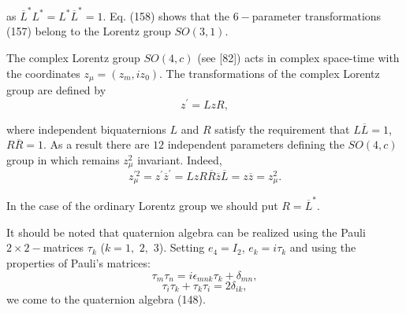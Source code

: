 \documentclass[a4paper,12pt]{article}
\begin{document}
as $\overline{L}^{*}L^{*}=L^{*}\overline{L}^{*}=1.$ Eq. (158)
shows that the $6-$parameter transformations (157) belong to the
Lorentz group $ SO(3,1) $.

The complex Lorentz group $SO(4,c)$ (see [82]) acts in complex
space-time with the coordinates $z_\mu =(z_m,iz_0)$. The
transformations of the complex Lorentz group are defined by
\begin{equation}
z^{\prime }=LzR,  \label{159}
\end{equation}

where independent biquaternions $L$ and $R$ satisfy the
requirement that $L \overline{L}=1$, $R\overline{R}=1$. As a
result there are $12$ independent parameters defining the
$SO(4,c)$ group in which remains $z_\mu ^2$ invariant. Indeed,
\begin{equation}
z_\mu ^{\prime 2}=z^{\prime }\overline{z}^{\prime
}=LzR\overline{R}\overline{ z}\overline{L}=z\overline{z}=z_\mu ^2.
\label{160}
\end{equation}

In the case of the ordinary Lorentz group we should put $R=\overline{L}^{*}$.

It should be noted that quaternion algebra can be realized using
the Pauli $ 2\times 2-$matrices $\tau _k$ ($k=1,$ $2,$ $3$).
Setting $e_4=I_2$, $ e_k=i\tau _k$ and using the properties of
Pauli's matrices:
\[
\tau _m\tau _n=i\epsilon _{mnk}\tau _k+\delta _{mn},
\]
\vspace{-8mm}
\begin{equation}  \label{161}
\end{equation}
\vspace{-8mm}
\[
\tau _i\tau _k+\tau _k\tau _i=2\delta _{ik},
\]
we come to the quaternion algebra (148).
\end{document}
